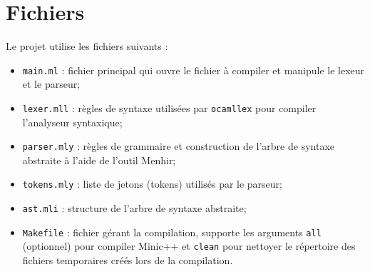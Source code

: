 \documentclass{article}
\begin{document}
\section*{Fichiers}
Le projet utilise les fichiers suivants :
\begin{itemize}
  \item \texttt{main.ml} : fichier principal qui ouvre le fichier à
    compiler et manipule le lexeur et le parseur;
  \item \texttt{lexer.mll} : règles de syntaxe utilisées par \texttt{ocamllex} pour
    compiler l'analyseur syntaxique;
  \item \texttt{parser.mly} : règles de grammaire et construction de l'arbre de
    syntaxe abstraite à l'aide de l'outil Menhir;
  \item \texttt{tokens.mly} : liste de jetons (tokens) utilisés par le parseur;
  \item \texttt{ast.mli} : structure de l'arbre de syntaxe abstraite;
  \item \texttt{Makefile} : fichier gérant la compilation, supporte les
    arguments \texttt{all} (optionnel) pour compiler Minic++ et \texttt{clean} pour
    nettoyer le répertoire des fichiers temporaires créés lors de la compilation.
\end{itemize}
  
\end{document}
